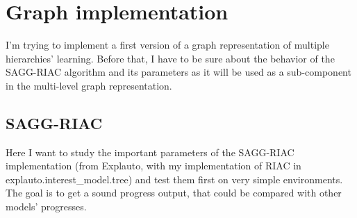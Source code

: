 \documentclass[12pt]{article}
\begin{document}
	
	
%




%


	
\section{Graph implementation}

	I'm trying to implement a first version of a graph representation of multiple hierarchies' learning.
	Before that, I have to be sure about the behavior of the SAGG-RIAC algorithm and its parameters 
	as it will be used as a sub-component in the multi-level graph representation.

	\subsection{SAGG-RIAC}
	\label{sec:saggriac}
		Here I want to study the important parameters of the SAGG-RIAC implementation 
		(from Explauto, with my implementation of RIAC in explauto.interest\_model.tree) and test them first on very simple environments.
		The goal is to get a sound progress output, that could be compared with other models' progresses.
		
\end{document}
